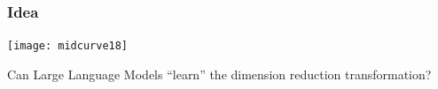 \begin{frame}[fragile]\frametitle{Idea}
\begin{center}
\texttt{[image: midcurve18]}

Can Large Language Models ``learn'' the dimension reduction transformation?
\end{center}	
\end{frame}










